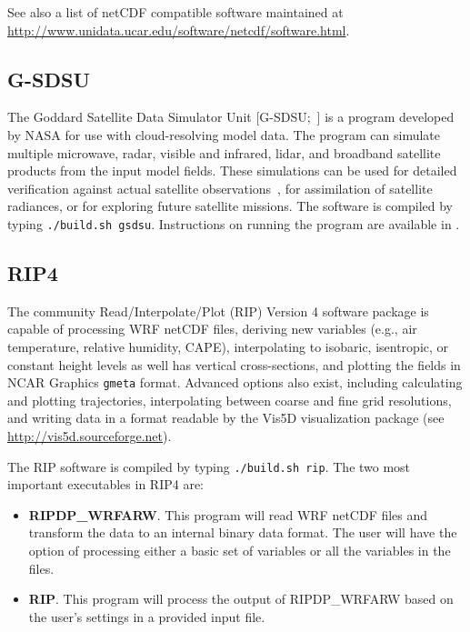 See also a list of netCDF compatible software maintained at 
\url{http://www.unidata.ucar.edu/software/netcdf/software.html}.

\subsection{G-SDSU}

The Goddard Satellite Data Simulator Unit [G-SDSU;~\cite{ref:MatsuiEtAl2014}] 
is a program developed by NASA for use with cloud-resolving model data. 
The program can simulate multiple microwave, radar, visible and 
infrared, lidar, and broadband satellite products from the input model 
fields. These simulations can be used for detailed verification against actual
satellite observations~\citep{ref:MatsuiEtAl2009}, for assimilation of 
satellite radiances, or for exploring future satellite missions. The software 
is compiled by typing \texttt{./build.sh gsdsu}. Instructions on running the 
program are available in \cite{ref:GsdsuUserGuide}.

\subsection{RIP4}

The community Read/Interpolate/Plot (RIP) Version 4 software package is 
capable of processing WRF netCDF files, deriving new variables (e.g., air 
temperature, relative humidity, CAPE), interpolating to isobaric, isentropic, 
or constant height levels as well has vertical cross-sections, and plotting
the fields in NCAR Graphics \texttt{gmeta} format. Advanced options also
exist, including calculating and plotting trajectories, interpolating
between coarse and fine grid resolutions, and writing data in a format
readable by the Vis5D visualization package (see 
\url{http://vis5d.sourceforge.net}).

The RIP software is compiled by typing \texttt{./build.sh rip}. The two most 
important executables in RIP4 are:

\begin{itemize}
\item \textbf{RIPDP\_WRFARW}. This program will read WRF netCDF files and
transform the data to an internal binary data format. The user will have
the option of processing either a basic set of variables or all the
variables in the files.
\item \textbf{RIP}. This program will process the output of RIPDP\_WRFARW
based on the user's settings in a provided input file.
\end{itemize}

